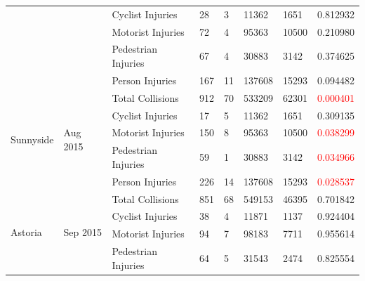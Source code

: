 \documentclass[10pt,journal,compsoc]{IEEEtran}
\begin{document}
\begin{table}[]
\begin{tabular}{|l|l|l|l|l|l|l|l|}
                                            &                             & Cyclist Injuries    & 28        & 3        & 11362      & 1651      & 0.812932 \\ \cline{3-8} 
                                            &                             & Motorist Injuries   & 72        & 4        & 95363      & 10500     & 0.210980 \\ \cline{3-8} 
                                            &                             & Pedestrian Injuries & 67        & 4        & 30883      & 3142      & 0.374625 \\ \cline{3-8} 
                                            &                             & Person Injuries     & 167       & 11       & 137608     & 15293     & 0.094482 \\ \hline
\multirow{5}{*}{Sunnyside}                  & \multirow{5}{*}{Aug 2015} & Total Collisions    & 912       & 70       & 533209     & 62301     & \textcolor{red}{0.000401} \\ \cline{3-8} 
                                            &                             & Cyclist Injuries    & 17        & 5        & 11362      & 1651      & 0.309135 \\ \cline{3-8} 
                                            &                             & Motorist Injuries   & 150       & 8        & 95363      & 10500     & \textcolor{red}{0.038299} \\ \cline{3-8} 
                                            &                             & Pedestrian Injuries & 59        & 1        & 30883      & 3142      & \textcolor{red}{0.034966} \\ \cline{3-8} 
                                            &                             & Person Injuries     & 226       & 14       & 137608     & 15293     & \textcolor{red}{0.028537} \\ \hline
\multirow{5}{*}{Astoria}                    & \multirow{5}{*}{Sep 2015} & Total Collisions    & 851       & 68       & 549153     & 46395     & 0.701842 \\ \cline{3-8} 
                                            &                             & Cyclist Injuries    & 38        & 4        & 11871      & 1137      & 0.924404 \\ \cline{3-8} 
                                            &                             & Motorist Injuries   & 94        & 7        & 98183      & 7711      & 0.955614 \\ \cline{3-8} 
                                            &                             & Pedestrian Injuries & 64        & 5        & 31543      & 2474      & 0.825554 \\ \cline{3-8} 

\end{tabular}
\end{table}
\end{document}
